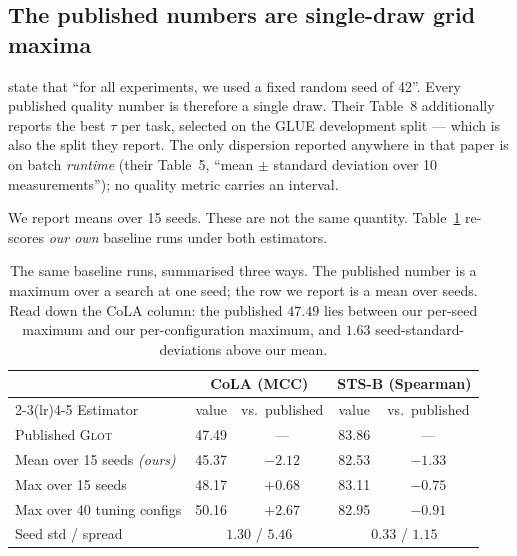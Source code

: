 \documentclass{article} %
\begin{document}
\subsection{The published numbers are single-draw grid maxima}
\label{sec:estimator}

\citet{mantri2026glot} state that ``for all experiments, we used a fixed random
seed of 42''. Every published quality number is therefore a single draw. Their
Table~8 additionally reports the best $\tau$ per task, selected on the GLUE
development split --- which is also the split they report. The only dispersion
reported anywhere in that paper is on batch \emph{runtime} (their Table~5,
``mean $\pm$ standard deviation over 10 measurements''); no quality metric
carries an interval.

We report means over 15 seeds. These are not the same quantity.
Table~\ref{tab:estimator} re-scores \emph{our own} baseline runs under both
estimators.

\begin{table}[t]
\caption{The same baseline runs, summarised three ways. The published number is
a maximum over a search at one seed; the row we report is a mean over seeds.
Read down the CoLA column: the published $47.49$ lies between our per-seed
maximum and our per-configuration maximum, and $1.63$ seed-standard-deviations
above our mean.}
\label{tab:estimator}
\begin{center}
\begin{tabular}{lcccc}
\toprule
 & \multicolumn{2}{c}{CoLA (MCC)} & \multicolumn{2}{c}{STS-B (Spearman)} \\
\cmidrule(lr){2-3}\cmidrule(lr){4-5}
Estimator & value & vs.\ published & value & vs.\ published \\
\midrule
Published \textsc{Glot}          & 47.49 & --- & 83.86 & --- \\
\midrule
Mean over 15 seeds \emph{(ours)} & 45.37 & $-2.12$ & 82.53 & $-1.33$ \\
Max over 15 seeds                & 48.17 & $\mathbf{+0.68}$ & 83.11 & $-0.75$ \\
Max over 40 tuning configs       & 50.16 & $\mathbf{+2.67}$ & 82.95 & $-0.91$ \\
\midrule
Seed std / spread                & \multicolumn{2}{c}{$1.30$ / $5.46$} &
                                   \multicolumn{2}{c}{$0.33$ / $1.15$} \\
\bottomrule
\end{tabular}
\end{center}
\end{table}
\end{document}
